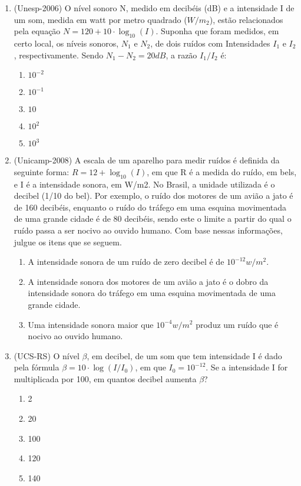 \begin{enumerate}
\item {}\label{Unesp2006}

(Unesp-2006) O nível sonoro N, medido em decibéis (dB) e a intensidade I de um som, medida em watt por metro quadrado 
($W/m_2$), estão relacionados pela equação $N=120+10\cdot \log_{10} (I)$. Suponha que foram medidos, em certo local, os 
níveis sonoros, $N_1$ e $N_2$, de dois ruídos com Intensidades $I_1$ e $I_2$, respectivamente. Sendo $N_1 - N_2 = 20 dB$, 
a razão $I_1/I_2$ é:
\begin{enumerate}
    \item $10^{-2}$
    \item $10^{-1}$
     \item $10$
     \item $10^{2}$
     \item $10^{3}$
\end{enumerate}


\item {} \label{Unicamp2008}

(Unicamp-2008) A escala de um aparelho para medir ruídos é definida da seguinte forma: $R = 12 + \log_{10}(I)$, em que R 
é a medida do ruído, em bels, e I é a intensidade sonora, em W/m2. No Brasil, a unidade utilizada é o decibel (1/10 do 
bel). Por exemplo, o ruído dos motores de um avião a jato é de 160 decibéis, enquanto o ruído do tráfego em uma esquina 
movimentada de uma grande cidade é de 80 decibéis, sendo este o limite a partir do qual o ruído passa a ser nocivo ao 
ouvido humano. Com base nessas informações, julgue os itens que se seguem.

\begin{enumerate}
\item A intensidade sonora de um ruído de zero decibel é de $10^{-12} w/m^2$. 

\item A intensidade sonora dos motores de um avião a jato é o dobro da intensidade sonora do tráfego em uma esquina movimentada de uma grande cidade.

\item Uma intensidade sonora maior que $10^{-4} w/m^2$ produz um ruído que é nocivo ao ouvido humano. 
\end{enumerate}


\item {}\label{UCSSRS}

(UCS-RS) O nível $\beta$, em decibel, de um som que tem intensidade I é dado pela fórmula $\beta = 10 \cdot \log
(I/I_0)$, em que $I_0 = 10^{-12}$. Se a intensidade I for multiplicada por 100, em quantos decibel aumenta $\beta$?

\begin{enumerate}
    \item 2
    \item 20
    \item 100
    \item 120
    \item 140
\end{enumerate}
\end{enumerate}
\clearpage

